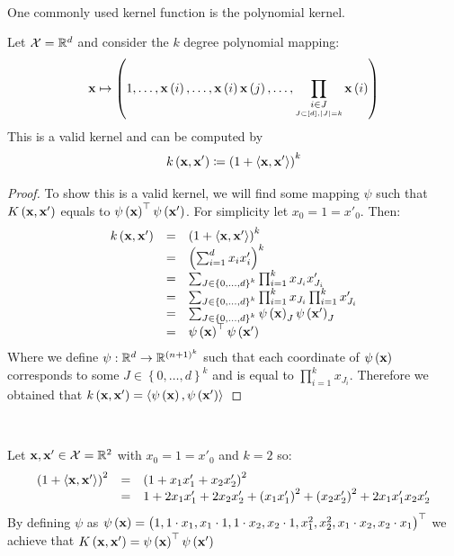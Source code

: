 ~\\One commonly used kernel function is the polynomial kernel.
\begin{claim}
	Let $\mathcal{X}=\mathbb{R}^d$ and consider the $k$ degree polynomial mapping:$$\mathbf{x}\mapsto\left(1,\ldots,\mathbf{x}\left(i\right),\ldots,\mathbf{x}\left(i\right)\mathbf{x}\left(j\right),\ldots,\prod_{\underset{J\subset\left[d\right],\left|J\right|=k}{i\in J}}\mathbf{x}\left(i\right)\right)$$
	This is a valid kernel and can be computed by $$ k\left(\mathbf{x},\mathbf{x}'\right)\coloneqq\left(1+\left\langle \mathbf{x},\mathbf{x}'\right\rangle\right)^k $$
\end{claim}
\begin{proof}
	To show this is a valid kernel, we will find some mapping $\psi$ such that $K\left(\mathbf{x},\mathbf{x}'\right)$ equals to $\psi\left(\mathbf{x}\right)^\top \psi\left(\mathbf{x}'\right)$. For simplicity let $x_0=1=x'_0$. Then: 
	$$
	\begin{array}{ccl}
		k\left(\mathbf{x},\mathbf{x}'\right) & = &\left(1+\left\langle \mathbf{x},\mathbf{x}'\right\rangle\right)^k\\
		& = & \left(\sum_{i=1}^d x_ix'_i\right)^k\\
		& = & \sum_{J\in\left\{0,\ldots,d\right\}^k}\prod_{i=1}^{k}x_{J_i}x'_{J_i}\\
		& = & \sum_{J\in\left\{0,\ldots,d\right\}^k}\prod_{i=1}^{k}x_{J_i}\prod_{i=1}^{k}x'_{J_i}\\
		& = & \sum_{J\in\left\{0,\ldots,d\right\}^k}\psi\left(\mathbf{x}\right)_J\psi\left(\mathbf{x}'\right)_J\\
		& = & \psi\left(\mathbf{x}\right)^\top \psi\left(\mathbf{x}'\right)
	\end{array}
	$$
	Where we define $\psi:\mathbb{R}^d\rightarrow\mathbb{R}^{\left(n+1\right)^k}$ such that each coordinate of $\psi\left(\mathbf{x}\right)$ corresponds to some $J\in\left\{0,\ldots,d\right\}^k$ and is equal to $\prod_{i=1}^k x_{J_i}$. Therefore we obtained that $k\left(\mathbf{x},\mathbf{x}'\right) = \left\langle \psi\left(\mathbf{x}\right),\psi\left(\mathbf{x}'\right)\right\rangle$
\end{proof}

~\\
\begin{example}
	Let $\mathbf{x},\mathbf{x}'\in \mathcal{X}=\mathbb{R}^2$ with $x_0=1=x'_0$ and $k=2$ so:
	$$ \begin{array}{ccl}
		\left(1+\left\langle \mathbf{x},\mathbf{x}'\right\rangle\right)^2 & = & \left(1+x_1x'_1 + x_2x'_2\right)^2\\
		& = & 1 + 2x_1x'_1 + 2x_2x'_2 + \left(x_1x'_1\right)^2 + \left(x_2x'_2\right)^2 + 2x_1x'_1x_2x'_2
	\end{array} $$
	By defining $\psi$ as $\psi\left(\mathbf{x}\right)=\left(1,1\cdot x_1, x_1 \cdot 1, 1\cdot x_2, x_2\cdot 1, x_1^2, x_2^2, x_1\cdot x_2, x_2 \cdot x_1\right)^\top$ we achieve that $K\left(\mathbf{x},\mathbf{x}'\right)=\psi\left(\mathbf{x}\right)^\top \psi\left(\mathbf{x}'\right)$
\end{example}

